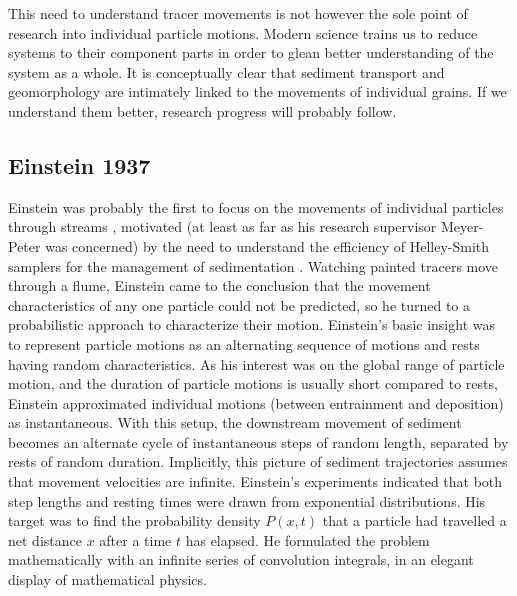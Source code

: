 This need to understand tracer movements is not however the sole point of research into individual particle motions. Modern science trains us to reduce systems to their component parts in order to glean better understanding of the system as a whole. It is conceptually clear that sediment transport and geomorphology are intimately linked to the movements of individual grains. If we understand them better, research progress will probably follow.


\subsection{ Einstein 1937}
Einstein was probably the first to focus on the movements of individual particles through streams \citep{Einstein1937}, motivated (at least as far as his research supervisor Meyer-Peter was concerned) by the need to understand the efficiency of Helley-Smith samplers for the management of sedimentation \citep{Ettema2004}.
Watching painted tracers move through a flume, Einstein came to the conclusion that the movement characteristics of any one particle could not be predicted, so he turned to a probabilistic approach to characterize their motion.
Einstein's basic insight was to represent particle motions as an alternating sequence of motions and rests having random characteristics.
As his interest was on the global range of particle motion, and the duration of particle motions is usually short compared to rests, Einstein approximated individual motions (between entrainment and deposition) as instantaneous.
With this setup, the downstream movement of sediment becomes an alternate cycle of instantaneous steps of random length, separated by rests of random duration. 
Implicitly, this picture of sediment trajectories assumes that movement velocities are infinite.
Einstein's experiments indicated that both step lengths and resting times were drawn from exponential distributions. His target was to find the probability density $P(x,t)$ that a particle had travelled a net distance $x$ after a time $t$ has elapsed. He formulated the problem mathematically with an infinite series of convolution integrals, in an elegant display of mathematical physics. 


